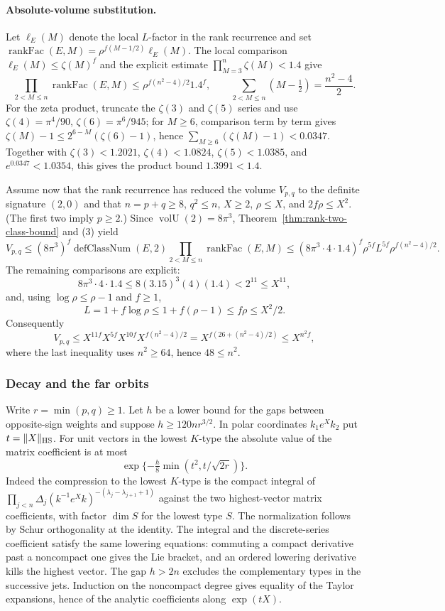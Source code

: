 \paragraph{Absolute-volume substitution.} Let $\ell_E(M)$ denote the local
$L$-factor in the rank recurrence and set
$\operatorname{rankFac}(E,M)=\rho^{f(M-1/2)}\ell_E(M)$. The local comparison
$\ell_E(M)\leq\zeta(M)^f$ and the explicit estimate
$\prod_{M=3}^{n}\zeta(M)<1.4$ give
\[
\prod_{2<M\leq n}\operatorname{rankFac}(E,M)
\leq\rho^{f(n^2-4)/2}1.4^f,
\qquad\sum_{2<M\leq n}(M-\tfrac12)=\frac{n^2-4}{2}.
\tag{3}
\]
For the zeta product, truncate the $\zeta(3)$ and $\zeta(5)$ series and use
$\zeta(4)=\pi^4/90$, $\zeta(6)=\pi^6/945$; for $M\geq6$, comparison term by
term gives $\zeta(M)-1\leq2^{6-M}(\zeta(6)-1)$, hence
$\sum_{M\geq6}(\zeta(M)-1)<0.0347$. Together with $\zeta(3)<1.2021$,
$\zeta(4)<1.0824$, $\zeta(5)<1.0385$, and $e^{0.0347}<1.0354$, this gives the
product bound $1.3991<1.4$.

Assume now that the rank recurrence has reduced the volume $V_{p,q}$ to the
definite signature $(2,0)$ and that $n=p+q\geq8$, $q^2\leq n$, $X\geq2$,
$\rho\leq X$, and $2f\rho\leq X^2$. (The first two imply $p\geq2$.) Since $\operatorname{volU}(2)=8\pi^3$,
Theorem~\ref{thm:rank-two-class-bound} and (3) yield
\[
V_{p,q}\leq(8\pi^3)^f\operatorname{defClassNum}(E,2)
\prod_{2<M\leq n}\operatorname{rankFac}(E,M)
\leq(8\pi^3\cdot4\cdot1.4)^f\rho^{5f}L^{5f}\rho^{f(n^2-4)/2}.
\]
The remaining comparisons are explicit:
\[
8\pi^3\cdot4\cdot1.4\leq8(3.15)^3(4)(1.4)<2^{11}\leq X^{11},
\]
and, using $\log\rho\leq\rho-1$ and $f\geq1$,
\[
L=1+f\log\rho\leq1+f(\rho-1)\leq f\rho\leq X^2/2.
\]
Consequently
\[
V_{p,q}\leq X^{11f}X^{5f}X^{10f}X^{f(n^2-4)/2}
=X^{f(26+(n^2-4)/2)}\leq X^{n^2f},
\]
where the last inequality uses $n^2\geq64$, hence $48\leq n^2$.

\subsubsection{Decay and the far orbits}

Write $r=\min(p,q)\ge1$. Let $h$ be a lower bound for the gaps between opposite-sign weights and suppose $h\ge120nr^{3/2}$. In polar coordinates $k_1e^Xk_2$ put $t=\|X\|_{\rm HS}$. For unit vectors in the lowest $K$-type the absolute value of the matrix coefficient is at most
\[
 \exp\{-\tfrac h8\min(t^2,t/\sqrt{2r})\}.
\]
Indeed the compression to the lowest $K$-type is the compact integral of
$\prod_{j<n}\Delta_j(k^{-1}e^Xk)^{-(\lambda_j-\lambda_{j+1}+1)}$
against the two highest-vector matrix coefficients, with factor $\dim S$ for the lowest type $S$. The normalization follows by Schur orthogonality at the identity. The integral and the discrete-series coefficient satisfy the same lowering equations: commuting a compact derivative past a noncompact one gives the Lie bracket, and an ordered lowering derivative kills the highest vector. The gap $h>2n$ excludes the complementary types in the successive jets. Induction on the noncompact degree gives equality of the Taylor expansions, hence of the analytic coefficients along $\exp(tX)$.

